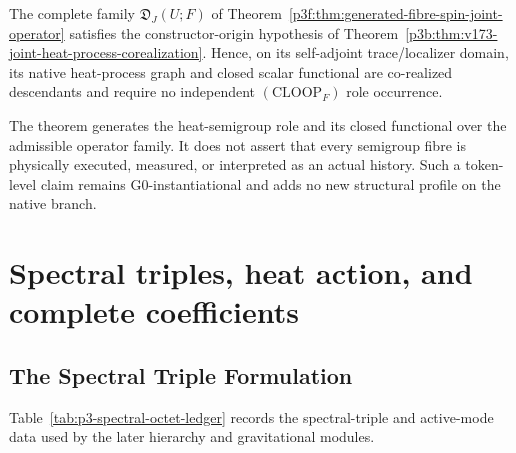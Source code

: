 \documentclass[12pt,a4paper]{article}
\begin{document}
\begin{corollary}
\label{p3b:cor:v173-joint-heat-process-application}
The complete family \(\mathfrak D_J(U;F)\) of
Theorem~\ref{p3f:thm:generated-fibre-spin-joint-operator} satisfies the
constructor-origin hypothesis of
Theorem~\ref{p3b:thm:v173-joint-heat-process-corealization}.  Hence, on its
self-adjoint trace/localizer domain, its native heat-process graph and closed
scalar functional are co-realized descendants and require no independent
\((\mathrm{CLOOP}_F)\) role occurrence.
\end{corollary}

\begin{remark}
\label{p3b:rem:v173-heat-role-token-firewall}
The theorem generates the heat-semigroup role and its closed functional over
the admissible operator family.  It does not assert that every semigroup fibre
is physically executed, measured, or interpreted as an actual history.  Such
a token-level claim remains G0-instantiational and adds no new structural
profile on the native branch.
\end{remark}


\section{Spectral triples, heat action, and complete coefficients}
\label{paper3b:sec:organized-spectral}
\subsection{The Spectral Triple Formulation}
\label{p3:sec:spectraltriple}

Table~\ref{tab:p3-spectral-octet-ledger} records the spectral-triple and active-mode data used by the later hierarchy and gravitational modules.
\end{document}
